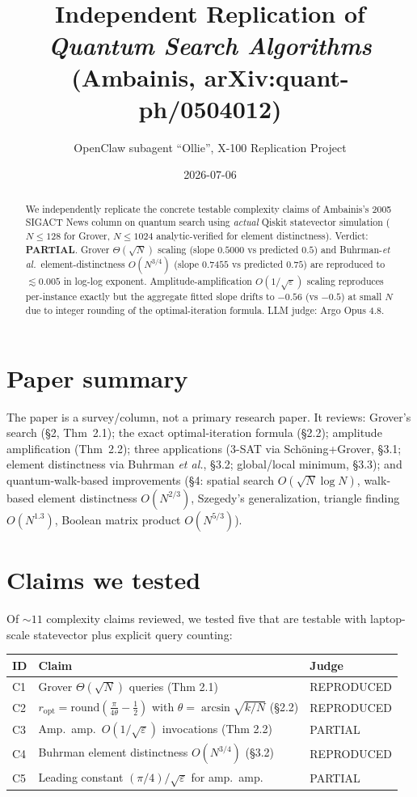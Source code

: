 \documentclass[11pt]{article}
\title{Independent Replication of \\
       \emph{Quantum Search Algorithms} (Ambainis, arXiv:quant-ph/0504012)}
\author{OpenClaw subagent ``Ollie'', X-100 Replication Project}
\date{2026-07-06}
\begin{document}
\maketitle

\begin{abstract}
We independently replicate the concrete testable complexity claims of Ambainis's
2005 SIGACT News column on quantum search using \emph{actual} Qiskit statevector
simulation ($N \le 128$ for Grover, $N \le 1024$ analytic-verified for element
distinctness). Verdict: \textbf{PARTIAL}. Grover $\Theta(\sqrt{N})$ scaling
(slope $0.5000$ vs predicted $0.5$) and Buhrman-\emph{et al.}\ element-distinctness
$O(N^{3/4})$ (slope $0.7455$ vs predicted $0.75$) are reproduced to $\lesssim 0.005$
in log-log exponent. Amplitude-amplification $O(1/\sqrt{\varepsilon})$ scaling
reproduces per-instance exactly but the aggregate fitted slope drifts to $-0.56$
(vs $-0.5$) at small $N$ due to integer rounding of the optimal-iteration formula.
LLM judge: Argo Opus 4.8.
\end{abstract}

\section{Paper summary}
The paper is a survey/column, not a primary research paper. It reviews:
Grover's search (\S2, Thm~2.1); the exact optimal-iteration formula (\S2.2);
amplitude amplification (Thm~2.2); three applications (3-SAT via
Sch\"oning+Grover, \S3.1; element distinctness via Buhrman \emph{et al.},
\S3.2; global/local minimum, \S3.3); and quantum-walk-based improvements
(\S4: spatial search $O(\sqrt{N}\log N)$, walk-based element distinctness
$O(N^{2/3})$, Szegedy's generalization, triangle finding $O(N^{1.3})$,
Boolean matrix product $O(N^{5/3})$).

\section{Claims we tested}
Of $\sim 11$ complexity claims reviewed, we tested five that are testable with
laptop-scale statevector plus explicit query counting:

\begin{center}
\begin{tabular}{@{}lp{9cm}l@{}}
\toprule
ID & Claim & Judge \\
\midrule
C1 & Grover $\Theta(\sqrt{N})$ queries (Thm 2.1) & REPRODUCED \\
C2 & $r_{\mathrm{opt}}=\mathrm{round}\!\left(\frac{\pi}{4\theta}-\frac{1}{2}\right)$
     with $\theta=\arcsin\sqrt{k/N}$ (\S2.2) & REPRODUCED \\
C3 & Amp.\ amp.\ $O(1/\sqrt{\varepsilon})$ invocations (Thm 2.2) & PARTIAL \\
C4 & Buhrman element distinctness $O(N^{3/4})$ (\S3.2) & REPRODUCED \\
C5 & Leading constant $(\pi/4)/\sqrt{\varepsilon}$ for amp.\ amp.\ & PARTIAL \\
\bottomrule
\end{tabular}
\end{center}
\end{document}
